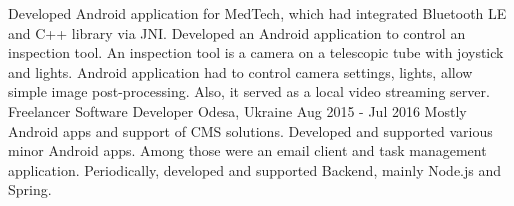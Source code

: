   {
    Developed Android application for MedTech, which had integrated Bluetooth LE and C++ library via JNI.
    \newline
    Developed an Android application to control an inspection tool.
    An inspection tool is a camera on a telescopic tube with joystick and lights.
    Android application had to control camera settings, lights, allow simple image post-processing.
    Also, it served as a local video streaming server.
  }
\cvexperience
  {Freelancer}
  {Software Developer}
  {Odesa, Ukraine}
  {Aug 2015 - Jul 2016}
  {
    Mostly Android apps and support of CMS solutions.
  }
  {
    Developed and supported various minor Android apps. Among those were an email client and task management application.
    \newline
    Periodically, developed and supported Backend, mainly Node.js and Spring.
  }

